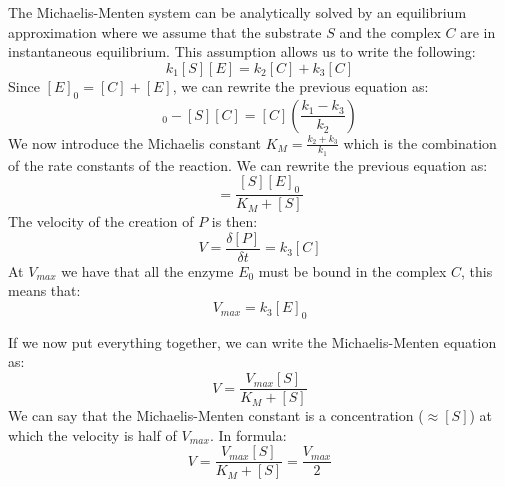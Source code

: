 The Michaelis-Menten system can be analytically solved by an equilibrium
approximation where we assume that the substrate $S$ and the complex $C$ are in
instantaneous equilibrium. This assumption allows us to write the following:
\begin{equation}
    k_1[S][E] = k_2[C] + k_3[C]
\end{equation}
Since $[E]_0 = [C] + [E]$, we can rewrite the previous equation as:
\begin{equation}
    [S][E]_0 - [S][C] = [C]\left( \frac{k_1 - k_3}{k_2}\right)
\end{equation}
We now introduce the Michaelis constant $K_M = \frac{k_2 + k_3}{k_1}$ which is
the combination of the rate constants of the reaction. We can rewrite the previous
equation as:
\begin{equation}
    [C] = \frac{[S][E]_0}{K_M + [S]}
\end{equation}
The velocity of the creation of $P$ is then:
\begin{equation}
    V = \frac{\delta [P]}{\delta t} = k_3[C]
\end{equation}
At $V_{max}$ we have that all the enzyme $E_0$ must be bound in the complex $C$,
this means that:
\begin{equation}
    V_{max} = k_3[E]_0
\end{equation}

If we now put everything together, we can write the Michaelis-Menten equation as:
\begin{equation}
    V = \frac{V_{max}[S]}{K_M + [S]}
\end{equation}
We can say that the Michaelis-Menten constant is a concentration ($\approx [S]$)
at which the velocity is half of $V_{max}$. In formula:
\begin{equation}
    V = \frac{V_{max}[S]}{K_M + [S]} = \frac{V_{max}}{2}
\end{equation}